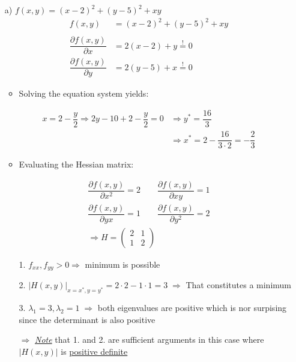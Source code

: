 \documentclass[12pt,a4paper]{article}
\begin{document}
\begin{itemize}
    \item[a)] $f(x,y) = (x -2)^2 + (y -5)^2 + xy$
    \begin{align*}
      f(x,y) & = (x -2)^2 + (y - 5)^2 + xy\\
      & \\
      \dfrac{\partial f(x,y)}{\partial x} & = 2(x -2) + y \overset{!}{=} 0 \\
      \dfrac{\partial f(x,y)}{\partial y} & = 2(y -5) + x \overset{!}{=} 0 
    \end{align*}
    \begin{itemize}
      \item Solving the equation system yields:
    \end{itemize}
    \begin{align*}
      x = 2 -\dfrac{y}{2} \Rightarrow 2y - 10 + 2 - \dfrac{y}{2} = 0 &\Rightarrow y^{*} = \dfrac{16}{3} \\
      &\Rightarrow x^{*} = 2 -\dfrac{16}{3 \cdot 2} = - \dfrac{2}{3}
    \end{align*}
    \begin{itemize}
      \item Evaluating the Hessian matrix:
    \end{itemize}
    \begin{align*}
      \dfrac{\partial f(x,y)}{\partial x^2} = 2 \qquad  \dfrac{\partial f(x,y)}{\partial xy} = 1 \\
      \dfrac{\partial f(x,y)}{\partial yx} = 1  \qquad  \dfrac{\partial f(x,y)}{\partial y^2} = 2\\
      \Rightarrow H = 
      \begin{pmatrix}
        2 & 1 \\
        1 & 2
      \end{pmatrix}
    \end{align*}
    \begin{itemize}
      \item[1.] $f_{xx}, f_{yy} > 0 \Rightarrow$ minimum is possible
      \item[2.] $\left| H(x,y) \right|_{x = x^{*}, y = y^{*}} = 2 \cdot 2 - 1 \cdot 1 = 3 \; \Rightarrow$ That constitutes a minimum
      \item[3.] $\lambda_1 = 3, \lambda_2 = 1 \; \Rightarrow$ both eigenvalues are positive which is nor surpising since the determinant is also positive
      \item[$\Rightarrow$] \underline{\textit{Note}} that 1. and 2. are sufficient arguments in this case where $\left| H(x,y) \right|$ is \underline{positive definite}

\end{itemize}
\end{itemize}
\end{document}
